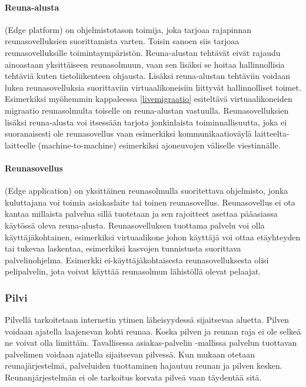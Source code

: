 \paragraph{Reuna-alusta}
(Edge platform) on ohjelmistotason toimija, joka tarjoaa rajapinnan reunasovelluksien suorittamista varten. Toisin sanoen siis tarjoaa reunasovelluksille toimintaympäristön.
Reuna-alustan tehtävät eivät rajaudu ainoastaan yksittäiseen reunasolmuun, vaan sen lisäksi se hoitaa hallinnollisia tehtäviä kuten tietoliikenteen ohjausta. Lisäksi reuna-alustan tehtäviin voidaan lukea reunasovelluksia suorittaviin virtuaalikoneisiin liittyvät hallinnolliset toimet. Esimerkiksi myöhemmin kappaleessa \ref{livemigraatio} esiteltävä virtuaalikoneiden migraatio reunasolmulta toiselle on reuna-alustan vastuulla.
Reunasovelluksien lisäksi reuna-alusta voi itsessään tarjota jonkinlaista toiminnallisuutta, joka ei suoranaisesti ole reunasovellus vaan esimerkiksi kommunikaatioväylä laitteelta-laitteelle (machine-to-machine) esimerkiksi ajoneuvojen väliselle viestinnälle. 

\paragraph{Reunasovellus}
(Edge application) on yksittäinen reunasolmulla suoritettava ohjelmisto, jonka kuluttajana voi toimia asiakaslaite tai toinen reunasovellus. Reunasovellus ei ota kantaa millaista palvelua sillä tuotetaan ja sen rajoitteet asettaa pääasiassa käytössä oleva reuna-alusta. Reunasovelluksen tuottama palvelu voi olla käyttäjäkohtainen, esimerkiksi virtuaalikone johon käyttäjä voi ottaa etäyhteyden tai tukevaa laskentaa, esimerkiksi kasvojen tunnistusta suorittava palvelinohjelma. Esimerkki ei-käyttäjäkohtaisesta reunasovelluksesta olisi pelipalvelin, jota voivat käyttää reunasolmun lähistöllä olevat pelaajat. 

\subsubsection{Pilvi}
Pilvellä tarkoitetaan internetin ytimen läheisyydessä sijaitsevaa aluetta.
Pilven voidaan ajatella laajenevan kohti reunaa. Koska pilven ja reunan raja ei ole selkeä ne voivat olla limittäin.
Tavallisessa asiakas-palvelin -mallissa palvelun tuottavan palvelimen voidaan ajatella sijaitsevan pilvessä. Kun mukaan otetaan reunajärjestelmä, palveluiden tuottaminen hajautuu reunan ja pilven kesken. Reunanjärjestelmän ei ole tarkoitus korvata pilveä vaan täydentää sitä. 


